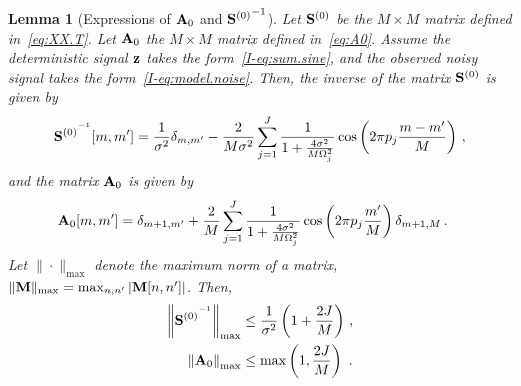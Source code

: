 \documentclass[journal,onecolumn]{IEEEtran}
\newtheorem{lemma}{Lemma}
\begin{document}
\begin{lemma}[Expressions of ${\mathbf A}_0$ and ${{\mathbf S}^{(0)}}^{-1}$]
Let ${\mathbf S}^{(0)}$ be the $M\times M$ matrix defined in~\eqref{eq:XX.T}. Let ${\mathbf A}_0$ the $M\times M$ matrix defined in~\eqref{eq:A0}. Assume the deterministic signal ${\mathbf z}$ takes the form~\eqref{I-eq:sum.sine}, and the observed noisy signal takes the form~\eqref{I-eq:model.noise}. Then, the inverse of the matrix ${\mathbf S}^{(0)}$ is given by
\begin{equation}
{\bS^{(0)}}^\inv[m,m']  = \dfrac1{\sigma^2}\delta_{m,m'}-\dfrac{2}{M\sigma^2}\sum_{j=1}^J\dfrac{1}{1+\frac{4\sigma^2}{M\Omega_j^2}}\cos\left(2\pi p_j \dfrac{m-m'}{M}\right)\,,
\label{eq:S0.inv}
\end{equation}
and the matrix ${\mathbf A}_0$ is given by
\begin{align}
\bA_0[m,m']  &= \delta_{m+1,m'} + \dfrac2M\sum_{j=1}^J\dfrac{1}{1+\frac{4\sigma^2}{M\Omega_j^2}}\cos\left(2\pi p_j\frac{m'}{M}\right)\delta_{m+1,M}\,.
\label{eq:A0.sine}
\end{align}
Let $\|\cdot\|_{\max}$ denote the maximum norm of a matrix, \ie~$\|{\mathbf M}\|_{\max} = \max_{n,n'} \left|{\mathbf M}[n,n']\right|$. Then,
\begin{align}
\label{eq:S0.inv.bound}
\left\|{\bS^{(0)}}^\inv\right\|_{\max} &\leq \dfrac1{\sigma^2}\left(1+\frac{2J}{M}\right)\,, \\
\left\|\bA_0\right\|_{\max} &\leq \max\left(1,\frac{2J}{M}\right)\ .
\label{eq:A0.bound}
\end{align}
\end{lemma}
\end{document}
